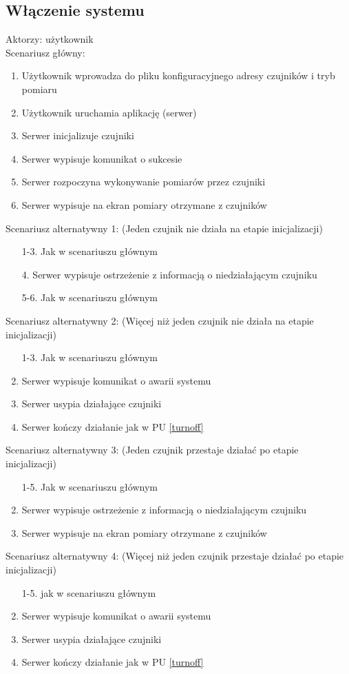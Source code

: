 \documentclass[a4paper,11pt]{article}
\begin{document}
\subsection{Włączenie systemu}
Aktorzy: użytkownik\\
Scenariusz główny:
\begin{enumerate}
   \item Użytkownik wprowadza do pliku konfiguracyjnego adresy czujników i tryb pomiaru
   \item Użytkownik uruchamia aplikację (serwer)
   \item Serwer inicjalizuje czujniki
   \item Serwer wypisuje komunikat o sukcesie
   \item Serwer rozpoczyna wykonywanie pomiarów przez czujniki
   \item Serwer wypisuje na ekran pomiary otrzymane z czujników
\end{enumerate}
Scenariusz alternatywny 1: (Jeden czujnik nie działa na etapie inicjalizacji)
\begin{enumerate}
   \item [1-3.] Jak w scenariuszu głównym
   \item [4.] Serwer wypisuje ostrzeżenie z informacją o niedziałającym czujniku
   \item [5-6.] Jak w scenariuszu głównym
\end{enumerate}
Scenariusz alternatywny 2: (Więcej niż jeden czujnik nie działa na etapie inicjalizacji)
\begin{enumerate}
   \item [1-3.] Jak w scenariuszu głównym
   \setcounter{enumi}{3}
   \item Serwer wypisuje komunikat o awarii systemu
   \item Serwer usypia działające czujniki
   \item Serwer kończy działanie jak w PU \ref{turnoff}
\end{enumerate}
Scenariusz alternatywny 3: (Jeden czujnik przestaje działać po etapie inicjalizacji)
\begin{enumerate}
   \item [1-5.] Jak w scenariuszu głównym
   \setcounter{enumi}{5}
   \item Serwer wypisuje ostrzeżenie z informacją o niedziałającym czujniku
   \item Serwer wypisuje na ekran pomiary otrzymane z czujników
\end{enumerate}
Scenariusz alternatywny 4: (Więcej niż jeden czujnik przestaje działać po etapie inicjalizacji)
\begin{enumerate}
   \item [1-5.] jak w scenariuszu głównym
   \setcounter{enumi}{5}
   \item Serwer wypisuje komunikat o awarii systemu
   \item Serwer usypia działające czujniki
   \item Serwer kończy działanie jak w PU \ref{turnoff}
\end{enumerate}
\end{document}
